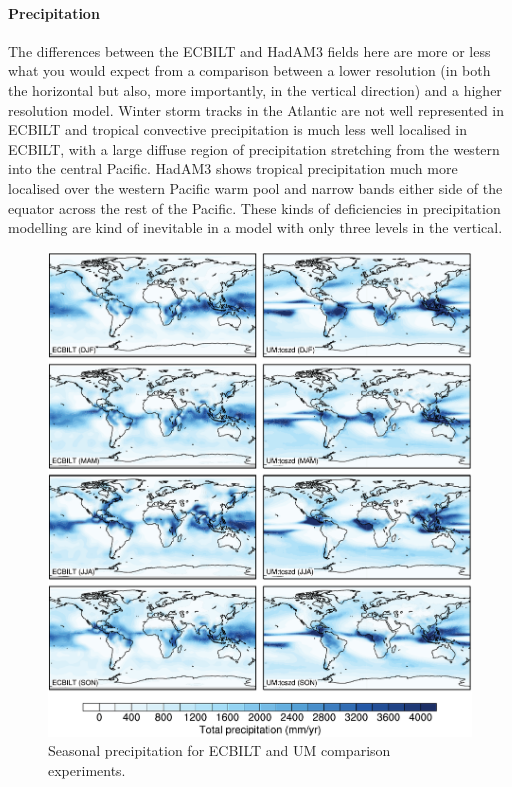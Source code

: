 \documentclass[a4paper,11pt,article]{article}
\begin{document}
\paragraph{Precipitation}

The differences between the ECBILT and HadAM3 fields here are more or
less what you would expect from a comparison between a lower
resolution (in both the horizontal but also, more importantly, in the
vertical direction) and a higher resolution model.  Winter storm
tracks in the Atlantic are not well represented in ECBILT and tropical
convective precipitation is much less well localised in ECBILT, with a
large diffuse region of precipitation stretching from the western into
the central Pacific.  HadAM3 shows tropical precipitation much more
localised over the western Pacific warm pool and narrow bands either
side of the equator across the rest of the Pacific.  These kinds of
deficiencies in precipitation modelling are kind of inevitable in a
model with only three levels in the vertical.

\begin{figure}
  \begin{center}
    \includegraphics[width=\textwidth]{control-expt-1/pp-plots}
  \end{center}
  \caption{Seasonal precipitation for ECBILT and UM comparison
    experiments.}
  \label{fig:pp}
\end{figure}
\end{document}
